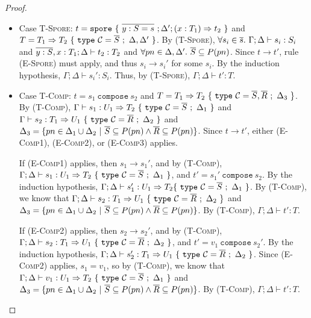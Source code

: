 \begin{proof}
\begin{itemize}
\item Case \textsc{T-Spore}: $t = \texttt{spore}~\{~\overline{y : S = s}~; \Delta'; (x: T_1) \Rightarrow t_2~\}$ and $T = T_1 \Rightarrow T_2~\{~\texttt{type}~\mathcal{C} = \overline{S}~;~\Delta, \Delta'~\}$. By (\textsc{T-Spore}), $\forall s_i \in \overline{s}.~\Gamma ; \Delta \vdash s_i : S_i$ and $\overline{y : S}, x : T_1 ; \Delta \vdash t_2 : T_2$ and $\forall pn \in \Delta, \Delta'.~\overline{S} \subseteq P(pn)$. Since $t \rightarrow t'$, rule (\textsc{E-Spore}) must apply, and thus $s_i \rightarrow s_i'$ for some $s_i$. By the induction hypothesis, $\Gamma ; \Delta \vdash s_i' : S_i$. Thus, by (\textsc{T-Spore}), $\Gamma ; \Delta \vdash t' : T$.

\item Case \textsc{T-Comp}: $t = s_1~\texttt{compose}~s_2$ and $T = T_1 \Rightarrow T_2~\{~\texttt{type}~\mathcal{C} = \overline{S}, \overline{R}~;~\Delta_3~\}$. By (\textsc{T-Comp}), $\Gamma \vdash s_1 : U_1 \Rightarrow T_2~\{~\texttt{type}~\mathcal{C} = \overline{S}~;~\Delta_1~\}$ and $\Gamma \vdash s_2 : T_1 \Rightarrow U_1~\{~\texttt{type}~\mathcal{C} = \overline{R}~;~\Delta_2~\}$ and $\Delta_3 = \{ pn \in \Delta_1 \cup \Delta_2 ~|~ \overline{S} \subseteq P(pn) \land \overline{R} \subseteq P(pn) \}$. Since $t \rightarrow t'$, either (\textsc{E-Comp1}), (\textsc{E-Comp2}), or (\textsc{E-Comp3}) applies.

If (\textsc{E-Comp1}) applies, then $s_1 \rightarrow s_1'$, and by (\textsc{T-Comp}), $\Gamma ; \Delta \vdash s_1 : U_1 \Rightarrow T_2~\{~\texttt{type}~\mathcal{C} = \overline{S}~;~\Delta_1~\}$, and $t' = s_1'~\texttt{compose}~s_2$. By the induction hypothesis, $\Gamma ; \Delta \vdash s_1' : U_1 \Rightarrow T_2\{~\texttt{type}~\mathcal{C} = \overline{S}~;~\Delta_1~\}$. By (\textsc{T-Comp}), we know that $\Gamma ; \Delta \vdash s_2 : T_1 \Rightarrow U_1~\{~\texttt{type}~\mathcal{C} = \overline{R}~;~\Delta_2~\}$ and $\Delta_3 = \{ pn \in \Delta_1 \cup \Delta_2 ~|~ \overline{S} \subseteq P(pn) \land \overline{R} \subseteq P(pn) \}$. By (\textsc{T-Comp}), $\Gamma ; \Delta \vdash t' : T$.

If (\textsc{E-Comp2}) applies, then $s_2 \rightarrow s_2'$, and by (\textsc{T-Comp}), $\Gamma ; \Delta \vdash s_2 : T_1 \Rightarrow U_1~\{~\texttt{type}~\mathcal{C} = \overline{R}~;~\Delta_2~\}$, and $t' = v_1~\texttt{compose}~s_2'$. By the induction hypothesis, $\Gamma ; \Delta \vdash s_2' : T_1 \Rightarrow U_1~\{~\texttt{type}~\mathcal{C} = \overline{R}~;~\Delta_2~\}$. Since (\textsc{E-Comp2}) applies, $s_1 = v_1$, so by (\textsc{T-Comp}), we know that $\Gamma ; \Delta \vdash v_1 : U_1 \Rightarrow T_2~\{~\texttt{type}~\mathcal{C} = \overline{S}~;~\Delta_1~\}$ and $\Delta_3 = \{ pn \in \Delta_1 \cup \Delta_2 ~|~ \overline{S} \subseteq P(pn) \land \overline{R} \subseteq P(pn) \}$. By (\textsc{T-Comp}), $\Gamma ; \Delta \vdash t' : T$.


\end{itemize}
\end{proof}
